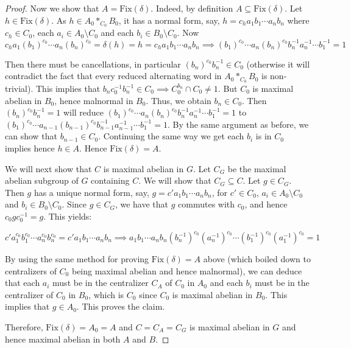 \documentclass[10pt,a4paper]{amsart}
\newcommand{\vs}{\vspace{10pt}}
\begin{document}
\begin{proof}
\vs 

Now we show that $A = \text{Fix}(\delta)$. Indeed, by definition $A \subseteq \text{Fix}(\delta)$. Let $h \in \text{Fix}(\delta)$. As $h \in A_0 *_{C_0} B_0$, it has a normal form, say, $h = c_h a_1b_1 \cdots a_nb_n$ where $c_h \in C_0$, each $a_i \in A_0 \setminus C_0$ and each $b_i \in B_0 \setminus C_0$. Now 
    \[
    c_h a_1(b_1)^{c_0} \cdots a_n(b_n)^{c_0} = \delta (h) = h = c_h a_1b_1 \cdots a_nb_n
    \implies (b_1)^{c_0} \cdots a_n(b_n)^{c_0} b_n^{-1}a_n^{-1} \cdots b_1^{-1} = 1
    \]

Then there must be cancellations, in particular $(b_n)^{c_0} b_n^{-1} \in C_0$ (otherwise it will contradict the fact that every reduced alternating word in $A_0 *_{C_0} B_0$ is non-trivial). This implies that $b_n c_0^{-1} b_n^{-1} \in C_0 \implies C_0^{b_n} \cap C_0\neq 1$. But $C_0$ is maximal abelian in $B_0$, hence malnormal in $B_0$. Thus, we obtain $b_n \in C_0$. Then $(b_n)^{c_0} b_n^{-1} = 1$ will reduce $(b_1)^{c_0} \cdots a_n(b_n)^{c_0} b_n^{-1}a_n^{-1} \cdots b_1^{-1} = 1$ to $(b_1)^{c_0} \cdots a_{n-1}(b_{n-1})^{c_0} b_{n-1}^{-1}a_{n-1}^{-1} \cdots b_1^{-1} = 1$. By the same argument as before, we can show that $b_{n-1} \in C_0$. Continuing the same way we get each $b_i$ is in $C_0$ implies hence $h \in A$. Hence $\text{Fix} (\delta) = A$.

\vs

We will next show that $C$ is maximal abelian in $G$. Let $C_G$ be the maximal abelian subgroup of $G$ containing $C$. We will show that $C_G \subseteq C$. Let $g \in C_G$. Then $g$ has a unique normal form, say, $g = c' a_1b_1 \cdots a_n b_n$, for $c' \in C_0$, $a_i \in A_0 \setminus C_0$ and $b_i \in B_0 \setminus C_0$. Since $g \in C_G$, we have that $g$ commutes with $c_0$, and hence $c_0 g c_0^{-1} = g$. This yields: 


$$ c' a_1^{c_0}b_1^{c_0} \cdots a_n^{c_0} b_n^{c_0} = c' a_1b_1 \cdots a_n b_n \implies a_1b_1 \cdots a_n b_n (b_n^{-1})^{c_0}(a_n^{-1})^{c_0} \cdots (b_1^{-1})^{c_0} (a_1^{-1})^{c_0} = 1$$


By using the same method for proving $\text{Fix} (\delta) = A$ above (which boiled down to centralizers of $C_0$ being maximal abelian and hence malnormal), we can deduce that each $a_i$ must be in the centralizer $C_A$ of $C_0$ in $A_0$ and each $b_i$ must be in the centralizer of $C_0$ in $B_0$, which is $C_0$ since $C_0$ is maximal abelian in $B_0$. This implies that $g \in A_0$. This proves the claim. 



Therefore, $\text{Fix}(\delta) = A_0 = A$ and $C = C_A = C_G$ is maximal abelian in $G$ and hence maximal abelian in both $A$ and $B$.

\end{proof}
\end{document}
